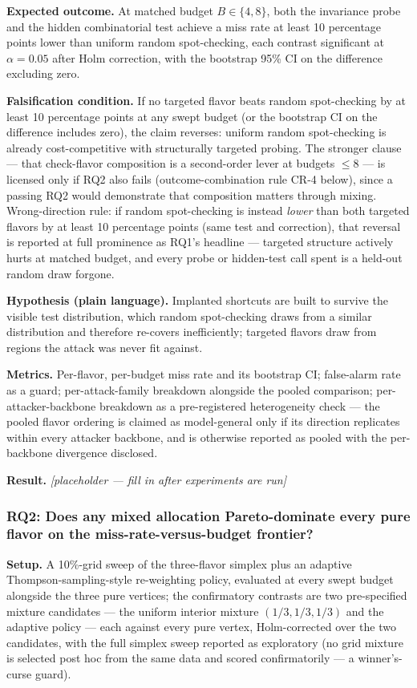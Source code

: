 \documentclass[11pt]{article}
\newcommand{\ph}{\textit{[placeholder --- fill in after experiments are run]}}
\begin{document}
\textbf{Expected outcome.} At matched budget $B \in \{4,8\}$, both the invariance probe and the hidden combinatorial test achieve a miss rate at least 10 percentage points lower than uniform random spot-checking, each contrast significant at $\alpha=0.05$ after Holm correction, with the bootstrap 95\% CI on the difference excluding zero.

\textbf{Falsification condition.} If no targeted flavor beats random spot-checking by at least 10 percentage points at any swept budget (or the bootstrap CI on the difference includes zero), the claim reverses: uniform random spot-checking is already cost-competitive with structurally targeted probing. The stronger clause --- that check-flavor composition is a second-order lever at budgets $\leq 8$ --- is licensed only if RQ2 also fails (outcome-combination rule CR-4 below), since a passing RQ2 would demonstrate that composition matters through mixing. Wrong-direction rule: if random spot-checking is instead \emph{lower} than both targeted flavors by at least 10 percentage points (same test and correction), that reversal is reported at full prominence as RQ1's headline --- targeted structure actively hurts at matched budget, and every probe or hidden-test call spent is a held-out random draw forgone.

\textbf{Hypothesis (plain language).} Implanted shortcuts are built to survive the visible test distribution, which random spot-checking draws from a similar distribution and therefore re-covers inefficiently; targeted flavors draw from regions the attack was never fit against.

\textbf{Metrics.} Per-flavor, per-budget miss rate and its bootstrap CI; false-alarm rate as a guard; per-attack-family breakdown alongside the pooled comparison; per-attacker-backbone breakdown as a pre-registered heterogeneity check --- the pooled flavor ordering is claimed as model-general only if its direction replicates within every attacker backbone, and is otherwise reported as pooled with the per-backbone divergence disclosed.

\textbf{Result.} \ph

\subsubsection{RQ2: Does any mixed allocation Pareto-dominate every pure flavor on the miss-rate-versus-budget frontier?}
\textbf{Setup.} A 10\%-grid sweep of the three-flavor simplex plus an adaptive Thompson-sampling-style re-weighting policy, evaluated at every swept budget alongside the three pure vertices; the confirmatory contrasts are two pre-specified mixture candidates --- the uniform interior mixture $(1/3,1/3,1/3)$ and the adaptive policy --- each against every pure vertex, Holm-corrected over the two candidates, with the full simplex sweep reported as exploratory (no grid mixture is selected post hoc from the same data and scored confirmatorily --- a winner's-curse guard).
\end{document}

